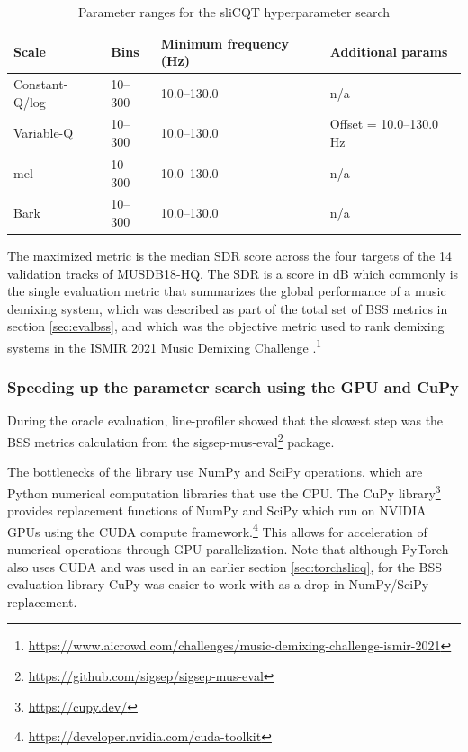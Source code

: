 \documentclass[report.tex]{subfiles}
\begin{document}
\begin{table}[ht]
	\centering
	\caption{Parameter ranges for the sliCQT hyperparameter search}
	\label{table:slicqparams}
\begin{tabular}{ |l|l|l|l| }
	 \hline
	 Scale & Bins & Minimum frequency (Hz) & Additional params \\
	 \hline
	 \hline
	 Constant-Q/log & 10--300 & 10.0--130.0 & n/a \\
	 \hline
	 Variable-Q & 10--300 & 10.0--130.0 & Offset = 10.0--130.0 Hz \\
	 \hline
	 \hline
	 mel & 10--300 & 10.0--130.0 & n/a \\
	 \hline
	 Bark & 10--300 & 10.0--130.0 & n/a \\
	 \hline
\end{tabular}
\end{table}

The maximized metric is the median SDR score across the four targets of the 14 validation tracks of MUSDB18-HQ. The SDR is a score in dB which commonly is the single evaluation metric that summarizes the global performance of a music demixing system, which was described as part of the total set of BSS metrics in section \ref{sec:evalbss}, and which was the objective metric used to rank demixing systems in the ISMIR 2021 Music Demixing Challenge \parencite{mdx21}.\footnote{\url{https://www.aicrowd.com/challenges/music-demixing-challenge-ismir-2021}}

\subsubsection{Speeding up the parameter search using the GPU and CuPy}
\label{sec:fasterbsscupy}

During the oracle evaluation, line-profiler showed that the slowest step was the BSS metrics calculation from the sigsep-mus-eval\footnote{\url{https://github.com/sigsep/sigsep-mus-eval}} package.

The bottlenecks of the library use NumPy and SciPy operations, which are Python numerical computation libraries that use the CPU. The CuPy library\footnote{\url{https://cupy.dev/}} provides replacement functions of NumPy and SciPy which run on NVIDIA GPUs using the CUDA compute framework.\footnote{\url{https://developer.nvidia.com/cuda-toolkit}} This allows for acceleration of numerical operations through GPU parallelization. Note that although PyTorch also uses CUDA and was used in an earlier section \ref{sec:torchslicq}, for the BSS evaluation library CuPy was easier to work with as a drop-in NumPy/SciPy replacement.
\end{document}

